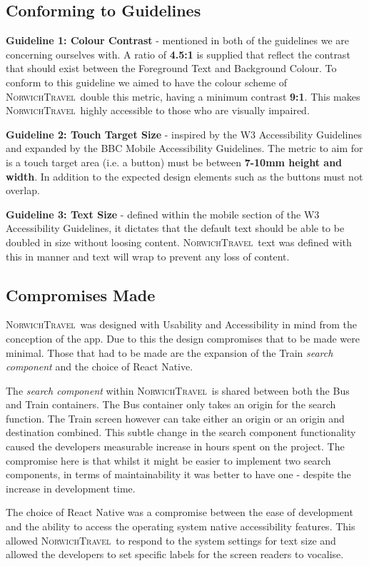 \documentclass[cmpstyle]{ueacmpstyle}
\newcommand{\nt}{\textsc{NorwichTravel}}
\begin{document}
		\subsection{Conforming to Guidelines} \label{sec:conform}
		\textbf{Guideline 1: Colour Contrast} - mentioned in both of the guidelines we are concerning ourselves with. A ratio of \textbf{4.5:1} is supplied that reflect the contrast that should exist between the Foreground Text and Background Colour. To conform to this guideline we aimed to have the colour scheme of \nt \ double this metric, having a minimum contrast \textbf{9:1}. This makes \nt \ highly accessible to those who are visually impaired.
		
		\textbf{Guideline 2: Touch Target Size} - inspired by the W3 Accessibility Guidelines and expanded by the BBC Mobile Accessibility Guidelines. The metric to aim for is a touch target area (i.e. a button) must be between \textbf{7-10mm height and width}. In addition to the expected design elements such as the buttons must not overlap.
		
		\textbf{Guideline 3: Text Size} - defined within the mobile section of the W3 Accessibility Guidelines, it dictates that the default text should be able to be doubled in size without loosing content. \nt \ text was defined with this in manner and text will wrap to prevent any loss of content.
		
		\subsection{Compromises Made} \label{sec:comp}
		\nt \ was designed with Usability and Accessibility in mind from the conception of the app. Due to this the design compromises that to be made were minimal. Those that had to be made are the expansion of the Train \textit{search component} and the choice of React Native. 
		
		The \textit{search component} within \nt \ is shared between both the Bus and Train containers. The Bus container only takes an origin for the search function. The Train screen however can take either an origin or an origin and destination combined. This subtle change in the search component functionality caused the developers measurable increase in hours spent on the project. The compromise here is that whilst it might be easier to implement two search components, in terms of maintainability it was better to have one - despite the increase in development time.
		
		The choice of React Native was a compromise between the ease of development and the ability to access the operating system native accessibility features. This allowed \nt \ to respond to the system settings for text size and allowed the developers to set specific labels for the screen readers to vocalise. 
		
\end{document}
